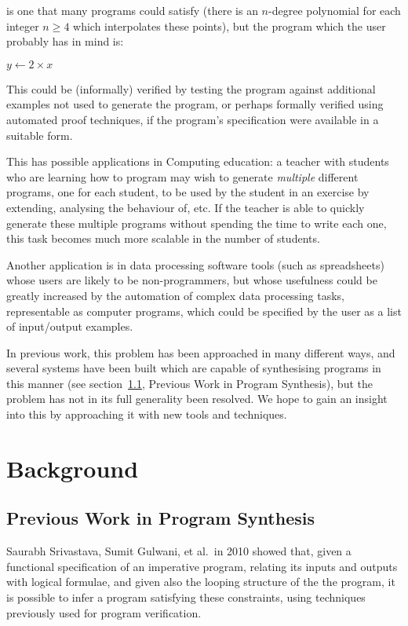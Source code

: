 \documentclass[a4paper,twoside,notitlepage]{article}
\begin{document}
is one that many programs could satisfy (there is an $n$-degree polynomial for each 
integer $n \geq 4$ which interpolates these points), but the program which the user 
probably has in mind is:

\begin{algorithmic}[H]
\State $y \gets 2 \times x$
\end{algorithmic}

This could be (informally) verified by testing the program against additional 
examples not used to generate the program, or perhaps formally verified using 
automated proof techniques, if the program's specification were available in a 
suitable form.

This has possible applications in Computing education: a teacher with students who are 
learning how to program may wish to generate \emph{multiple} different programs, one 
for each student, to be used by the student in an exercise by extending, analysing the 
behaviour of, etc. If the teacher is able to quickly generate these multiple programs 
without spending the time to write each one, this task becomes much more scalable in 
the number of students.

Another application is in data processing software tools (such as spreadsheets) whose 
users are likely to be non-programmers, but whose usefulness could be greatly increased 
by the automation of complex data processing tasks, representable as computer programs, 
which could be specified by the user as a list of input/output examples.

In previous work, this problem has been approached in many different ways, and 
several systems have been built which are capable of synthesising programs in 
this manner (see section~\ref{sec:prvsyn}, Previous Work in Program 
Synthesis), but the problem has not in its full generality been resolved. We 
hope to gain an insight into this by approaching it with new tools and 
techniques.

\section{Background}

\subsection{Previous Work in Program Synthesis} \label{sec:prvsyn}

Saurabh Srivastava, Sumit Gulwani, et al.\ in 2010 showed\cite{popl10syn} 
that, given a functional specification of an imperative program, relating its 
inputs and outputs with logical formulae, and given also the looping structure 
of the the program, it is possible to infer a program satisfying these 
constraints, using techniques previously used for program verification.
\end{document}
